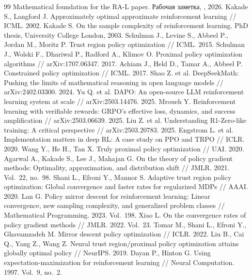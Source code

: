 \documentclass[11pt,a4paper]{article}
\theoremstyle{plain}
\theoremstyle{definition}
\theoremstyle{remark}
\begin{document}
\begin{thebibliography}{99}\small
{} Mathematical foundation for the RA-L paper. Рабочая заметка, , 2026.
 Kakade S., Langford J. Approximately optimal approximate reinforcement learning // ICML. 2002.
 Kakade S. On the sample complexity of reinforcement learning. PhD thesis, University College London, 2003.
 Schulman J., Levine S., Abbeel P., Jordan M., Moritz P. Trust region policy optimization // ICML. 2015.
 Schulman J., Wolski F., Dhariwal P., Radford A., Klimov O. Proximal policy optimization algorithms // arXiv:1707.06347. 2017.
 Achiam J., Held D., Tamar A., Abbeel P. Constrained policy optimization // ICML. 2017.
 Shao Z. et al. DeepSeekMath: Pushing the limits of mathematical reasoning in open language models // arXiv:2402.03300. 2024.
 Yu Q. et al. DAPO: An open-source LLM reinforcement learning system at scale // arXiv:2503.14476. 2025.
 Mroueh Y. Reinforcement learning with verifiable rewards: GRPO's effective loss, dynamics, and success amplification // arXiv:2503.06639. 2025.
 Liu Z. et al. Understanding R1-Zero-like training: A critical perspective // arXiv:2503.20783. 2025.
 Engstrom L. et al. Implementation matters in deep RL: A case study on PPO and TRPO // ICLR. 2020.
 Wang Y., He H., Tan X. Truly proximal policy optimization // UAI. 2020.
 Agarwal A., Kakade S., Lee J., Mahajan G. On the theory of policy gradient methods: Optimality, approximation, and distribution shift // JMLR. 2021. Vol.~22, no.~98.
 Shani L., Efroni Y., Mannor S. Adaptive trust region policy optimization: Global convergence and faster rates for regularized MDPs // AAAI. 2020.
 Lan G. Policy mirror descent for reinforcement learning: Linear convergence, new sampling complexity, and generalized problem classes // Mathematical Programming. 2023. Vol.~198.
 Xiao L. On the convergence rates of policy gradient methods // JMLR. 2022. Vol.~23.
 Tomar M., Shani L., Efroni Y., Ghavamzadeh M. Mirror descent policy optimization // ICLR. 2022.
 Liu B., Cai Q., Yang Z., Wang Z. Neural trust region/proximal policy optimization attains globally optimal policy // NeurIPS. 2019.
 Dayan P., Hinton G. Using expectation-maximization for reinforcement learning // Neural Computation. 1997. Vol.~9, no.~2.

\end{thebibliography}
\end{document}
